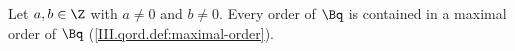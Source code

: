 Let $a,b\in\Z$ with $a\ne0$ and $b\ne0$. Every order of $\Bq$ is contained in a maximal order of $\Bq$ (\cref{III.qord.def:maximal-order}).
